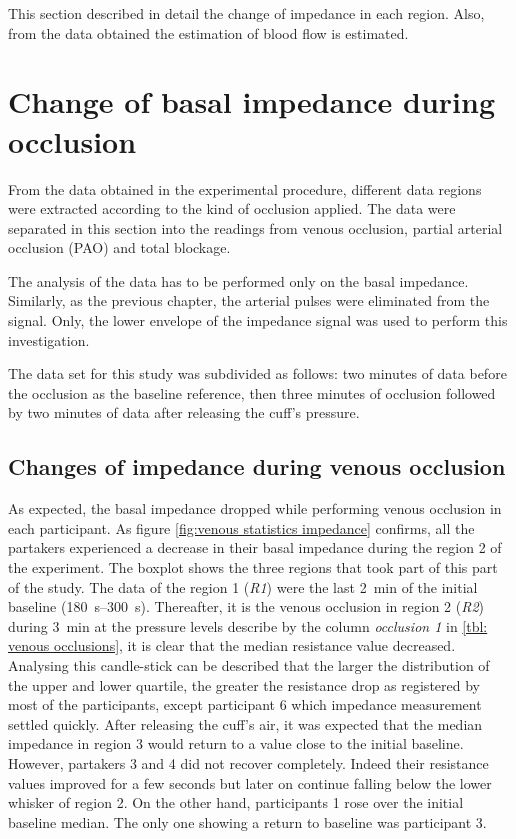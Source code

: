 This section described in detail the change of impedance in each region. Also, from the data obtained the estimation of blood flow is estimated.

\section{Change of basal impedance during occlusion}
\label{section occlusion 1}
From the data obtained in the experimental procedure, different data regions were extracted according to the kind of occlusion applied. The data were separated in this section into the readings from venous occlusion, partial arterial occlusion (PAO) and total blockage. 

The analysis of the data has to be performed only on the basal impedance. Similarly, as the previous chapter, the arterial pulses were eliminated from the signal. Only, the lower envelope of the impedance signal was used to perform this investigation. 

The data set for this study was subdivided as follows: two minutes of data before the occlusion as the baseline reference, then three minutes of occlusion followed by two minutes of data after releasing the cuff's pressure. 

\subsection{Changes of impedance during venous occlusion}
\label{section occlusion 1.1}
As expected, the basal impedance dropped while performing venous occlusion in each participant. As figure \ref{fig:venous statistics impedance} confirms, all the partakers experienced a decrease in their basal impedance during the region 2 of the experiment. The boxplot shows the three regions that took part of this part of the study. The data of the region 1 (\textit{R1}) were the last \SI{2}{\minute} of the initial baseline (\SIrange{180}{300}{\second}). Thereafter, it is the venous occlusion in region 2 (\textit{R2}) during \SI{3}{\minute} at the pressure levels describe by the column \textit{occlusion 1} in \ref{tbl: venous occlusions}, it is clear that the median resistance value decreased. Analysing this candle-stick can be described that the larger the distribution of the upper and lower quartile, the greater the resistance drop as registered by most of the participants, except participant 6 which impedance measurement settled quickly. After releasing the cuff's air, it was expected that the median impedance in region 3 would return to a value close to the initial baseline. However, partakers 3 and 4 did not recover completely. Indeed their resistance values improved for a few seconds but later on continue falling below the lower whisker of region 2. On the other hand, participants 1 rose over the initial baseline median. The only one showing a return to baseline was participant 3. 

